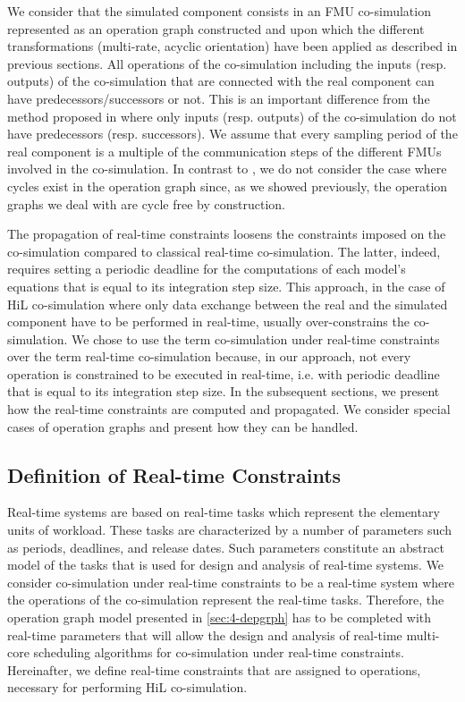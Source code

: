 We consider that the simulated component consists in an FMU co-simulation represented as an operation graph constructed and upon which the different transformations (multi-rate, acyclic orientation) have been applied as described in previous sections. All operations of the co-simulation including the inputs (resp. outputs) of the co-simulation that are connected with the real component can have predecessors/successors or not. This is an important difference from the method proposed in \cite{faure:2011} where only inputs (resp. outputs) of the co-simulation do not have predecessors (resp. successors). We assume that every sampling period of the real component is a multiple of the communication steps of the different FMUs involved in the co-simulation. In contrast to \cite{faure:2011}, we do not consider the case where cycles exist in the operation graph since, as we showed previously, the operation graphs we deal with are cycle free by construction. 

The propagation of real-time constraints loosens the constraints imposed on the co-simulation compared to classical real-time co-simulation. The latter, indeed, requires setting a periodic deadline for the computations of each model's equations that is equal to its integration step size. This approach, in the case of HiL co-simulation where only data exchange between the real and the simulated component have to be performed in real-time, usually over-constrains the co-simulation. We chose to use the term co-simulation under real-time constraints over the term real-time co-simulation because, in our approach, not every operation is constrained to be executed in real-time, i.e. with periodic deadline that is equal to its integration step size. In the subsequent sections, we present how the real-time constraints are computed and propagated. We consider special cases of operation graphs and present how they can be handled.

\subsection{Definition of Real-time Constraints}

Real-time systems are based on real-time tasks which represent the elementary units of workload. These tasks are characterized by a number of parameters such as periods, deadlines, and release dates. Such parameters constitute an abstract model of the tasks that is used for design and analysis of real-time systems. We consider co-simulation under real-time constraints to be a real-time system where the operations of the co-simulation represent the real-time tasks. Therefore, the operation graph model presented in \ref{sec:4-depgrph} has to be completed with real-time parameters that will allow the design and analysis of real-time multi-core scheduling algorithms for co-simulation under real-time constraints. Hereinafter, we define real-time constraints that are assigned to operations, necessary for performing HiL co-simulation.

